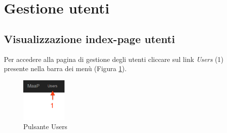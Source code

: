 \clearpage
\section{Gestione utenti}
\label{gestioneutenti}
	


	\subsection{Visualizzazione index-page utenti} %
	\label{visualizzaindexpageutenti}

			\label{pulsanteusers} Per accedere alla pagina di gestione degli utenti cliccare sul link \emph{Users} (1) presente nella barra dei menù (Figura \ref{fig:pulsanteusers}).

				\begin{figure}[H]
					\centering \includegraphics[width=0.2\textwidth]{img/usersButton.png}
					\caption{ \label{fig:pulsanteusers} Pulsante Users}
				\end{figure}





	\clearpage
